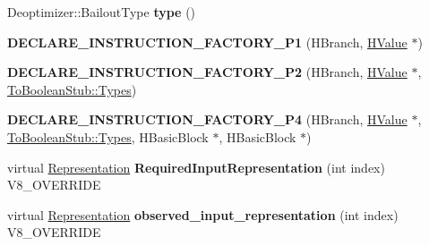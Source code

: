 \begin{DoxyCompactItemize}
\item 
\hypertarget{classv8_1_1internal_1_1_v8___f_i_n_a_l_aa07aba5be20bd074534c052ce4b72508}{}Deoptimizer\+::\+Bailout\+Type {\bfseries type} ()\label{classv8_1_1internal_1_1_v8___f_i_n_a_l_aa07aba5be20bd074534c052ce4b72508}

\item 
\hypertarget{classv8_1_1internal_1_1_v8___f_i_n_a_l_a03642f9d4fcb313e013dcaacd0f2d7f6}{}{\bfseries D\+E\+C\+L\+A\+R\+E\+\_\+\+I\+N\+S\+T\+R\+U\+C\+T\+I\+O\+N\+\_\+\+F\+A\+C\+T\+O\+R\+Y\+\_\+\+P1} (H\+Branch, \hyperlink{classv8_1_1internal_1_1_h_value}{H\+Value} $\ast$)\label{classv8_1_1internal_1_1_v8___f_i_n_a_l_a03642f9d4fcb313e013dcaacd0f2d7f6}

\item 
\hypertarget{classv8_1_1internal_1_1_v8___f_i_n_a_l_a064266eae220cad5f80b65f996cd113a}{}{\bfseries D\+E\+C\+L\+A\+R\+E\+\_\+\+I\+N\+S\+T\+R\+U\+C\+T\+I\+O\+N\+\_\+\+F\+A\+C\+T\+O\+R\+Y\+\_\+\+P2} (H\+Branch, \hyperlink{classv8_1_1internal_1_1_h_value}{H\+Value} $\ast$, \hyperlink{classv8_1_1internal_1_1_to_boolean_stub_1_1_types}{To\+Boolean\+Stub\+::\+Types})\label{classv8_1_1internal_1_1_v8___f_i_n_a_l_a064266eae220cad5f80b65f996cd113a}

\item 
\hypertarget{classv8_1_1internal_1_1_v8___f_i_n_a_l_ae8e308c065d7fbdb3acc68a1264a3b7f}{}{\bfseries D\+E\+C\+L\+A\+R\+E\+\_\+\+I\+N\+S\+T\+R\+U\+C\+T\+I\+O\+N\+\_\+\+F\+A\+C\+T\+O\+R\+Y\+\_\+\+P4} (H\+Branch, \hyperlink{classv8_1_1internal_1_1_h_value}{H\+Value} $\ast$, \hyperlink{classv8_1_1internal_1_1_to_boolean_stub_1_1_types}{To\+Boolean\+Stub\+::\+Types}, H\+Basic\+Block $\ast$, H\+Basic\+Block $\ast$)\label{classv8_1_1internal_1_1_v8___f_i_n_a_l_ae8e308c065d7fbdb3acc68a1264a3b7f}

\item 
\hypertarget{classv8_1_1internal_1_1_v8___f_i_n_a_l_a6c6d1f37f40b113d8f4062f1ffff7215}{}virtual \hyperlink{classv8_1_1internal_1_1_representation}{Representation} {\bfseries Required\+Input\+Representation} (int index) V8\+\_\+\+O\+V\+E\+R\+R\+I\+D\+E\label{classv8_1_1internal_1_1_v8___f_i_n_a_l_a6c6d1f37f40b113d8f4062f1ffff7215}

\item 
\hypertarget{classv8_1_1internal_1_1_v8___f_i_n_a_l_a0ae00f2f3ee0cfa82cd7f5d92e2db4b4}{}virtual \hyperlink{classv8_1_1internal_1_1_representation}{Representation} {\bfseries observed\+\_\+input\+\_\+representation} (int index) V8\+\_\+\+O\+V\+E\+R\+R\+I\+D\+E\label{classv8_1_1internal_1_1_v8___f_i_n_a_l_a0ae00f2f3ee0cfa82cd7f5d92e2db4b4}


\end{DoxyCompactItemize}
